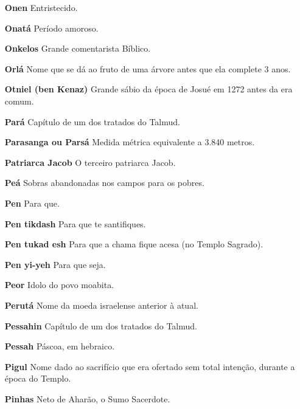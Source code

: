 \begin{itemize}
\item[\textbf{Onen}] Entristecido.

\item[\textbf{Onatá}] Período amoroso.

\item[\textbf{Onkelos}] Grande comentarista Bíblico.

\item[\textbf{Orlá}] Nome que se dá ao fruto de uma árvore antes que ela complete 3 anos.

\item[\textbf{Otniel (ben Kenaz)}] Grande sábio da época de Josué em 1272 antes da era comum.

\item[\textbf{Pará}] Capítulo de um dos tratados do Talmud.

\item[\textbf{Parasanga ou Parsá}] Medida métri­ca equivalente a 3.840
metros.

\item[\textbf{Patriarca Jacob}] O terceiro patriar­ca Jacob.

\item[\textbf{Peá}] Sobras abandonadas nos campos para os pobres.

\item[\textbf{Pen}] Para que.

\item[\textbf{Pen tikdash}] Para que te santifiques.

\item[\textbf{Pen tukad esh}] Para que a chama fi­que acesa (no Templo Sagrado).

\item[\textbf{Pen yi-yeh}] Para que seja.

\item[\textbf{Peor}] Idolo do povo moabita.

\item[\textbf{Perutá}] Nome da moeda israelense anterior à atual.

\item[\textbf{Pessahin}] Capítulo de um dos trata­dos do Talmud.

\item[\textbf{Pessah}] Páscoa, em hebraico.

\item[\textbf{Pigul}] Nome dado ao sacrifício que era ofertado sem total intenção, duran­te a época do Templo.

\item[\textbf{Pinhas}] Neto de Aharão, o Sumo Sa­cerdote.


\end{itemize}
